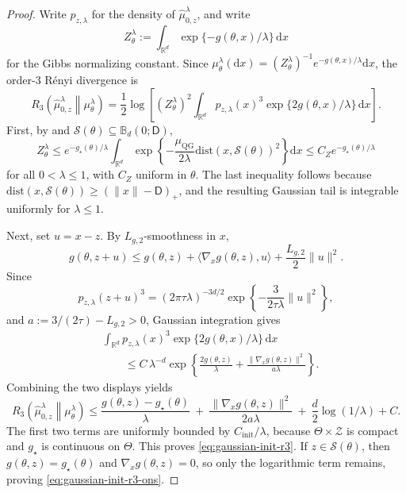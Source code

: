 \documentclass{article}
\theoremstyle{normaltheorem}
\newcommand{\gibbs}{\mu}
\newcommand{\ud}{\mathrm{d}}
\newcommand{\R}{\mathbb{R}}
\newcommand{\calS}{\mathcal{S}}
\begin{document}
\begin{proof}
Write \(p_{z,\lambda}\) for the density of \(\widehat\mu_{0,z}^{\lambda}\), and write
\[
Z_\theta^\lambda:=\int_{\R^d}\exp\{-g(\theta,x)/\lambda\}\,\ud x
\]
for the Gibbs normalizing constant. Since
\(\gibbs_\theta^\lambda(\ud x)=(Z_\theta^\lambda)^{-1}e^{-g(\theta,x)/\lambda}\ud x\), the order-$3$ R\'enyi
divergence is
\[
R_3\!\left(\widehat\mu_{0,z}^{\lambda}\middle\|\gibbs_\theta^\lambda\right)
=
\frac12\log\left[
(Z_\theta^\lambda)^2
\int_{\R^d}p_{z,\lambda}(x)^3\exp\{2g(\theta,x)/\lambda\}\,\ud x
\right].
\]
First, by  and \(\calS(\theta)\subseteq\mathbb B_d(0;\mathsf D)\),
\[
Z_\theta^\lambda
\le
e^{-g_\star(\theta)/\lambda}
\int_{\R^d}
\exp\!\left\{-\frac{\mu_{\mathrm{QG}}}{2\lambda}\mathrm{dist}(x,\calS(\theta))^2\right\}\ud x
\le
C_Z e^{-g_\star(\theta)/\lambda}
\]
for all \(0<\lambda\le1\), with \(C_Z\) uniform in \(\theta\). The last inequality follows because
\(\mathrm{dist}(x,\calS(\theta))\ge(\|x\|-\mathsf D)_+\), and the resulting Gaussian tail is integrable uniformly for
\(\lambda\le1\).

Next, set \(u=x-z\). By \(L_{g,2}\)-smoothness in \(x\),
\[
g(\theta,z+u)
\le
g(\theta,z)+\langle \nabla_x g(\theta,z),u\rangle+\frac{L_{g,2}}{2}\|u\|^2.
\]
Since
\[
p_{z,\lambda}(z+u)^3=(2\pi\tau\lambda)^{-3d/2}
\exp\!\left\{-\frac{3}{2\tau\lambda}\|u\|^2\right\},
\]
and \(a:=3/(2\tau)-L_{g,2}>0\), Gaussian integration gives
\[
\begin{aligned}
&\int_{\R^d}p_{z,\lambda}(x)^3\exp\{2g(\theta,x)/\lambda\}\,\ud x\\
&\qquad\le
C\,\lambda^{-d}
\exp\!\left\{
\frac{2g(\theta,z)}{\lambda}
+\frac{\|\nabla_x g(\theta,z)\|^2}{a\lambda}
\right\}.
\end{aligned}
\]
Combining the two displays yields
\[
R_3\!\left(\widehat\mu_{0,z}^{\lambda}\middle\|\gibbs_\theta^\lambda\right)
\le
\frac{g(\theta,z)-g_\star(\theta)}{\lambda}
\ +\ \frac{\|\nabla_x g(\theta,z)\|^2}{2a\lambda}
\ +\ \frac d2\log(1/\lambda)+C.
\]
The first two terms are uniformly bounded by \(C_{\mathrm{init}}/\lambda\), because
\(\Theta\times\mathcal Z\) is compact and \(g_\star\) is continuous on \(\Theta\).
This proves \eqref{eq:gaussian-init-r3}. If \(z\in\calS(\theta)\), then
\(g(\theta,z)=g_\star(\theta)\) and \(\nabla_x g(\theta,z)=0\), so only the logarithmic term remains, proving
\eqref{eq:gaussian-init-r3-ons}.
\end{proof}
\end{document}
